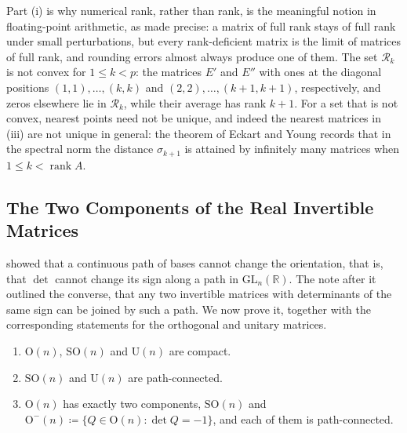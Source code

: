 Part (i) is why numerical rank, rather than rank, is the meaningful notion in floating-point arithmetic, as  made precise: a matrix of full rank stays of full rank under small perturbations, but every rank-deficient matrix is the limit of matrices of full rank, and rounding errors almost always produce one of them. The set $\mathcal R_k$ is not convex for $1\le k<p$: the matrices $E'$ and $E''$ with ones at the diagonal positions $(1,1),\ldots,(k,k)$ and $(2,2),\ldots,(k+1,k+1)$, respectively, and zeros elsewhere lie in $\mathcal R_k$, while their average has rank $k+1$. For a set that is not convex, nearest points need not be unique, and indeed the nearest matrices in (iii) are not unique in general: the theorem of Eckart and Young records that in the spectral norm the distance $\sigma_{k+1}$ is attained by infinitely many matrices when $1\le k<\operatorname{rank}A$.

\subsection{The Two Components of the Real Invertible Matrices}

 showed that a continuous path of bases cannot change the orientation, that is, that $\det$ cannot change its sign along a path in $\mathrm{GL}_n(\mathbb R)$. The note after it outlined the converse, that any two invertible matrices with determinants of the same sign can be joined by such a path. We now prove it, together with the corresponding statements for the orthogonal and unitary matrices.

\begin{theorem}
\label{thm:orthogonal-groups}
\leavevmode
\begin{enumerate}
\item $\mathrm O(n)$, $\mathrm{SO}(n)$ and $\mathrm U(n)$ are compact.
\item $\mathrm{SO}(n)$ and $\mathrm U(n)$ are path-connected.
\item $\mathrm O(n)$ has exactly two components, $\mathrm{SO}(n)$ and $\mathrm O^-(n)\coloneqq\{Q\in\mathrm O(n): \det Q=-1\}$, and each of them is path-connected.
\end{enumerate}
\end{theorem}

